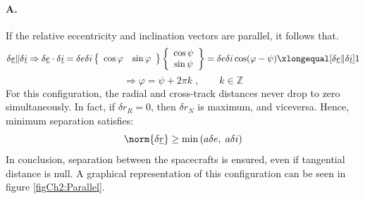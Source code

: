 			\paragraph{\textcolor{GMVred}{A.}  \\}
			\indent If the relative eccentricity and inclination vectors are parallel, it follows that.
			\[
			\delta\underline{e} \rVert \delta \underline{i} \Rightarrow \delta \underline{e} \cdot \delta\underline{i} = \delta e \delta i 
			\left\{ \begin{array}{cc}
			\cos\varphi & \sin\varphi
			\end{array}\right\}
			\left\{ \begin{array}{c}
			\cos\psi\\
			\sin\psi
			\end{array}\right\} =  \delta e \delta i \cos (\varphi - \psi) \xlongequal[\delta\underline{e} \rVert \delta \underline{i}]{} 1
			\]
			\begin{equation}
			\label{eqCh2:Parallel_ei}\Longrightarrow \varphi = \psi + 2\pi k\; , \qquad k \in \mathbb{Z}
			\end{equation}
			\indent For this configuration, the radial and cross-track distances never drop to zero simultaneously. In fact, if $\delta r_R = 0$, then $\delta r_N$ is maximum, and viceversa. Hence, minimum separation satisfies:
			\[
			\norm{\delta \underline{r}} \geq \min\left(a \delta e, \; a\delta i\right)
			\]
			\indent In conclusion, separation between the spacecrafts is ensured, even if tangential distance is null. A graphical representation of this configuration can be seen in figure \ref{figCh2:Parallel}.

